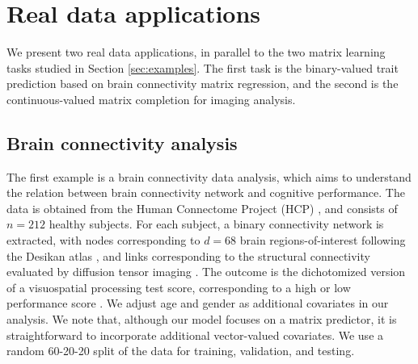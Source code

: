 \documentclass[11pt]{article}
\theoremstyle{plain}
\theoremstyle{definition}
\begin{document}
\section{Real data applications}
\label{sec:realdata}

We present two real data applications, in parallel to the two matrix learning tasks studied in Section \ref{sec:examples}. The first task is the binary-valued trait prediction based on brain connectivity matrix regression, and the second is the continuous-valued matrix completion for imaging analysis. 



\subsection{Brain connectivity analysis}
\label{sec:brain}

The first example is a brain connectivity data analysis, which aims to understand the relation between brain connectivity network and cognitive performance. The data is obtained from the Human Connectome Project (HCP) \citep{van2013wu}, and consists of $n=212$ healthy subjects. For each subject, a binary connectivity network is extracted, with nodes corresponding to $d=68$ brain regions-of-interest following the Desikan atlas \citep{desikan2006automated}, and links corresponding to the structural connectivity evaluated by diffusion tensor imaging \citep{zhang2018mapping}. The outcome is the dichotomized version of a visuospatial processing test score, corresponding to a high or low performance score \citep{wang2019common}. We adjust age and gender as additional covariates in our analysis. We note that, although our model focuses on a matrix predictor, it is straightforward to incorporate additional vector-valued covariates. We use a random 60-20-20 split of the data for training, validation, and testing. 
\end{document}
